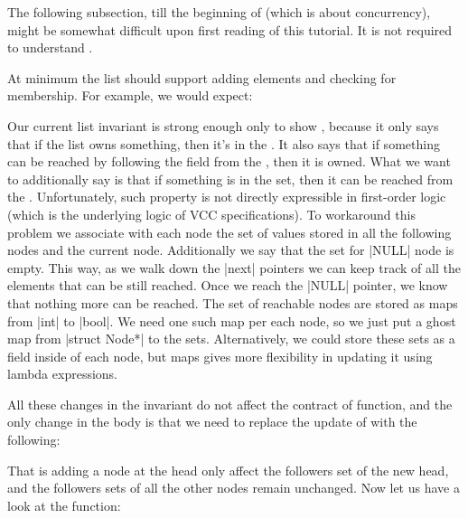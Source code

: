 \begin{note}
The following subsection, till the beginning of  (which is
about concurrency), might be somewhat difficult upon first reading of this
tutorial.
It is not required to understand .
\end{note}

At minimum the list should support adding elements and checking
for membership. For example, we would expect:


\noindent
Our current list invariant is strong enough only to show
, because it only says
that if the list owns something, then it's in the .
It also says that if something can be reached by following
the  field from the , then it is owned.
What we want to additionally say is that if something is in the 
set, then it can be reached from the .
Unfortunately, such property is not directly expressible in first-order
logic (which is the underlying logic of VCC specifications).
To workaround this problem we associate with each node
the set of values stored in all the following nodes and
the current node.
Additionally we say that the set for \vcc|NULL| node is empty.
This way, as we walk down the \vcc|next| pointers we can keep
track of all the elements that can be still reached.
Once we reach the \vcc|NULL| pointer, we know that nothing
more can be reached.
The set of reachable nodes are stored as maps from
\vcc|int| to \vcc|bool|.
We need one such map per each node, so we just
put a ghost map from \vcc|struct Node*| to the sets.
Alternatively, we could store these sets as a field inside of each node,
but maps gives more flexibility in updating it using lambda expressions.


\noindent
All these changes in the invariant do not affect
the contract of  function, and the only change in the body
is that we need to replace the update of  with the following:


\noindent
That is adding a node at the head only affect the followers set of the new head,
and the followers sets of all the other nodes remain unchanged.
Now let us have a look at the  function:


